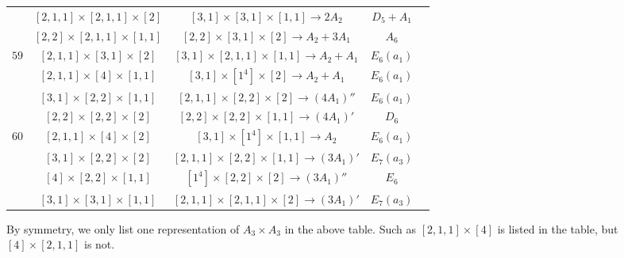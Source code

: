 \documentclass[reqno,12pt]{amsart}
\numberwithin{equation}{section}
\theoremstyle{plain}
\theoremstyle{definition}
\begin{document}
\begin{table}[htbp]
{\begin{tabular}{|c|c|c|c|c|}
& $ [2,1,1]\times [2,1,1]\times [2]$  &$[3,1]\times [3,1]\times [1,1]\rightarrow   2A_2$   &   $D_5+A_1$ \\

& $ [2,2]\times [2,1,1]\times [1,1]$  &$[2,2]\times [3,1]\times [2]\rightarrow   A_2+3A_1$   &   $A_6$ \\
\hline

$59$ 
& $ [2,1,1]\times [3,1]\times [2]$  &\small{ $[3,1]\times [2,1,1]\times [1,1]\rightarrow   A_2+A_1$  } &   $E_6(a_1)$ \\

& $ [2,1,1]\times [4]\times [1,1]$  &$[3,1]\times [1^4]\times [2]\rightarrow   A_2+A_1$   &   $E_6(a_1)$ \\
&\small{ $ [3,1]\times [2,2]\times [1,1]$  } &$[2,1,1]\times [2,2]\times [2]\rightarrow   (4A_1)''$  &   $E_6(a_1)$ \\
& $[2,2]\times [2,2]\times [2]$ &$[2,2]\times [2,2]\times [1,1]\rightarrow   (4A_1)'$   &   $D_6$ \\
\hline

$60$ 
& $ [2,1,1]\times [4]\times [2]$  & $[3,1]\times [1^4]\times [1,1]\rightarrow   A_2$   &   $E_6(a_1)$ \\

& $ [3,1]\times [2,2]\times [2]$  &$[2,1,1]\times [2,2]\times [1,1]\rightarrow   (3A_1)'$ &   $E_7(a_3)$ \\
& $ [4]\times [2,2]\times [1,1]$  &$[1^4]\times [2,2]\times [2]\rightarrow   (3A_1)''$   &   $E_6$ \\
& $[3,1]\times [3,1]\times [1,1]$ &$[2,1,1]\times [2,1,1]\times [2]\rightarrow   (3A_1)'$  &   $E_7(a_3)$ \\
\hline


\end{tabular}}
	
 \bigskip
	

By symmetry, we only list one representation of $A_3\times A_3$ in the above table. Such as $[2,1,1]\times [4]$ is listed in the table, but $[4]\times [2,1,1]$ is not.
\end{table}
\end{document}
